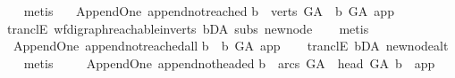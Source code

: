 \begin{isabellebody}
\ \ \isamarkupfalse%
\ {\isacharparenleft}{\kern0pt}metis{\isacharparenright}{\kern0pt}\ \isanewline
{}\isamarkupfalse%
%
\endisatagproof
{\isafoldproof}%
%
\isadelimproof
\isanewline
%
\endisadelimproof
\isanewline
\isanewline
{}\isamarkupfalse%
\ {\isacharparenleft}{\kern0pt}\ Append{\isacharunderscore}{\kern0pt}One{\isacharparenright}{\kern0pt}\ append{\isacharunderscore}{\kern0pt}not{\isacharunderscore}{\kern0pt}reached{\isacharcolon}{\kern0pt}\isanewline
{\isachardoublequoteopen}{\isasymforall}b\ {\isasymin}\ verts\ G{\isacharunderscore}{\kern0pt}A{\isachardot}{\kern0pt}\ {\isasymnot}\ b\ {\isasymrightarrow}\isactrlsup {\isacharplus}{\kern0pt}\isactrlbsub G{\isacharunderscore}{\kern0pt}A\isactrlesub \ app{\isachardoublequoteclose}\isanewline
%
\isadelimproof
\ \ %
\endisadelimproof
%
\isatagproof
{}\isamarkupfalse%
\ tranclE\ wf{\isacharunderscore}{\kern0pt}digraph{\isachardot}{\kern0pt}reachable{}{\isacharunderscore}{\kern0pt}in{\isacharunderscore}{\kern0pt}verts{\isacharparenleft}{\kern0pt}{}{\isacharparenright}{\kern0pt}\ bD{\isacharunderscore}{\kern0pt}A\ subs\ new{\isacharunderscore}{\kern0pt}node\isanewline
\ \ \isamarkupfalse%
\ metis%
\endisatagproof
{\isafoldproof}%
%
\isadelimproof
\ \ \isanewline
%
\endisadelimproof
\isanewline
\isanewline
{}\isamarkupfalse%
\ {\isacharparenleft}{\kern0pt}\ Append{\isacharunderscore}{\kern0pt}One{\isacharparenright}{\kern0pt}\ append{\isacharunderscore}{\kern0pt}not{\isacharunderscore}{\kern0pt}reached{\isacharunderscore}{\kern0pt}all{\isacharcolon}{\kern0pt}\isanewline
{\isachardoublequoteopen}{\isasymforall}b{\isachardot}{\kern0pt}\ {\isasymnot}\ b\ {\isasymrightarrow}\isactrlsup {\isacharplus}{\kern0pt}\isactrlbsub G{\isacharunderscore}{\kern0pt}A\isactrlesub \ app{\isachardoublequoteclose}\isanewline
%
\isadelimproof
\ \ %
\endisadelimproof
%
\isatagproof
{}\isamarkupfalse%
\ tranclE\ bD{\isacharunderscore}{\kern0pt}A\ new{\isacharunderscore}{\kern0pt}node{\isacharunderscore}{\kern0pt}alt\isanewline
\ \ \isamarkupfalse%
\ metis%
\endisatagproof
{\isafoldproof}%
%
\isadelimproof
\ \ \isanewline
%
\endisadelimproof
\isanewline
\isanewline
{}\isamarkupfalse%
\ {\isacharparenleft}{\kern0pt}\ Append{\isacharunderscore}{\kern0pt}One{\isacharparenright}{\kern0pt}\ append{\isacharunderscore}{\kern0pt}not{\isacharunderscore}{\kern0pt}headed{\isacharcolon}{\kern0pt}\isanewline
{\isachardoublequoteopen}{\isasymforall}b\ {\isasymin}\ arcs\ G{\isacharunderscore}{\kern0pt}A{\isachardot}{\kern0pt}\ {\isasymnot}\ head\ G{\isacharunderscore}{\kern0pt}A\ b\ {\isacharequal}{\kern0pt}\ app{\isachardoublequoteclose}\isanewline

\end{isabellebody}
